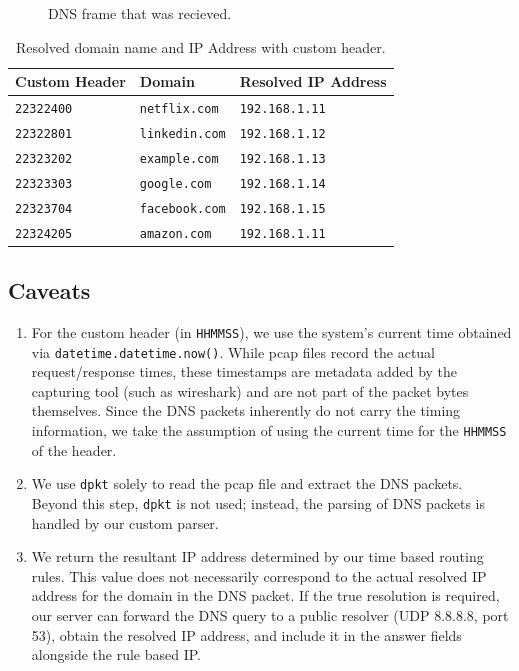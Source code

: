 \documentclass{article}
\begin{document}
\begin{figure}[H]
\begin{minipage}[t]{0.46\textwidth}
        \caption{DNS frame that was recieved.}
    \end{minipage}
\end{figure}


\begin{center}
\begin{table}[H]
\begin{tabularx}{\textwidth}{|l|X|l|}
\hline
\textbf{Custom Header} & \textbf{Domain} & \textbf{Resolved IP Address} \\
\hline
\texttt{22322400} & \texttt{netflix.com} & \texttt{192.168.1.11} \\
\hline
\texttt{22322801} & \texttt{linkedin.com} & \texttt{192.168.1.12} \\
\hline
\texttt{22323202} & \texttt{example.com} & \texttt{192.168.1.13} \\
\hline
\texttt{22323303} & \texttt{google.com} & \texttt{192.168.1.14} \\
\hline
\texttt{22323704} & \texttt{facebook.com} & \texttt{192.168.1.15} \\
\hline
\texttt{22324205} & \texttt{amazon.com} & \texttt{192.168.1.11} \\
\hline

\end{tabularx}
\caption{Resolved domain name and IP Address with custom header.}
\end{table}
\end{center}

\subsection{Caveats}
\begin{enumerate}
    \item For the custom header (in \texttt{HHMMSS}), we use the system’s current time obtained via \texttt{datetime.datetime.now()}. While pcap files record the actual request/response times, these timestamps are metadata added by the capturing tool (such as wireshark) and are not part of the packet bytes themselves. Since the DNS packets inherently do not carry the timing information, we take the assumption of using the current time for the \texttt{HHMMSS} of the header.
    \item We use \texttt{dpkt} solely to read the pcap file and extract the DNS packets. Beyond this step, \texttt{dpkt} is not used; instead, the parsing of DNS packets is handled by our custom parser.
    \item We return the resultant IP address determined by our time based routing rules. This value does not necessarily correspond to the actual resolved IP address for the domain in the DNS packet. If the true resolution is required, our server can forward the DNS query to a public resolver (UDP 8.8.8.8, port 53), obtain the resolved IP address, and include it in the answer fields alongside the rule based IP.
\end{enumerate}
\end{document}
